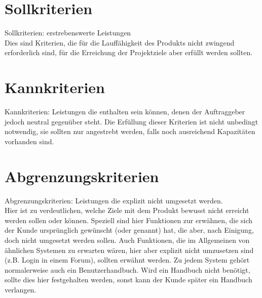 \section{Sollkriterien}\label{sec:sollkriterien}
Sollkriterien: erstrebenswerte Leistungen\\
Dies sind Kriterien, die für die Lauffähigkeit des Produkts nicht zwingend
erforderlich sind, für die Erreichung der Projektziele aber erfüllt werden
sollten.


\section{Kannkriterien}\label{sec:kannkriterien}

Kannkriterien: Leistungen die enthalten sein können, denen der Auftraggeber jedoch neutral gegenüber steht.
Die Erfüllung dieser Kriterien ist nicht unbedingt notwendig, sie sollten nur angestrebt werden, 
falls noch ausreichend Kapazitäten vorhanden sind.


\section{Abgrenzungskriterien}\label{sec:abgrenzungskriterien}
Abgrenzungskriterien: Leistungen die explizit nicht umgesetzt werden.\\
Hier ist zu verdeutlichen, welche Ziele mit dem Produkt bewusst nicht erreicht werden sollen oder können. 
Speziell sind hier Funktionen zur erwähnen, die sich der Kunde ursprünglich gewünscht (oder genannt) hat, die aber, nach Einigung, 
doch nicht umgesetzt werden sollen. Auch Funktionen, die im Allgemeinen von ähnlichen Systemen zu erwarten wären,
hier aber explizit nicht umzusetzen sind (z.B. Login in einem Forum), sollten erwähnt werden. 
Zu jedem System gehört normalerweise auch ein Benutzerhandbuch. Wird ein Handbuch nicht benötigt, 
sollte dies hier festgehalten werden, sonst kann der Kunde später ein Handbuch verlangen.

